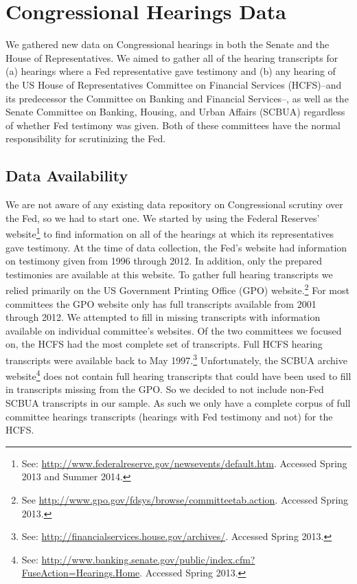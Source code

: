 \documentclass[a4paper]{article}\usepackage[]{graphicx}\usepackage[]{color}
\begin{document}
\section{Congressional Hearings Data}

We gathered new data on Congressional hearings in both the Senate and the House of Representatives. We aimed to gather all of the hearing transcripts for (a) hearings where a Fed representative gave testimony and (b) any hearing of the US House of Representatives Committee on Financial Services (HCFS)--and its predecessor the Committee on Banking and Financial Services--, as well as the Senate Committee on Banking, Housing, and Urban Affairs (SCBUA) regardless of whether Fed testimony was given. Both of these committees have the normal responsibility for scrutinizing the Fed.

\subsection{Data Availability}

We are not aware of any existing data repository on Congressional scrutiny over the Fed, so we had to start one. We started by using the Federal Reserves' website\footnote{See: \url{http://www.federalreserve.gov/newsevents/default.htm}. Accessed Spring 2013 and Summer 2014.} to find information on all of the hearings at which its representatives gave testimony. At the time of data collection, the Fed's website had information on testimony given from 1996 through 2012. In addition, only the prepared testimonies are available at this website. To gather full hearing transcripts we relied primarily on the US Government Printing Office (GPO) website.\footnote{See \url{http://www.gpo.gov/fdsys/browse/committeetab.action}. Accessed Spring 2013.} For most committees the GPO website only has full transcripts available from 2001 through 2012. We attempted to fill in missing transcripts with information available on individual committee's websites. Of the two committees we focused on, the HCFS had the most complete set of transcripts. Full HCFS hearing transcripts were available back to May 1997.\footnote{See: \url{http://financialservices.house.gov/archives/}. Accessed Spring 2013.} Unfortunately, the SCBUA archive website\footnote{See: \url{http://www.banking.senate.gov/public/index.cfm?FuseAction=Hearings.Home}. Accessed Spring 2013.} does not contain full hearing transcripts that could have been used to fill in transcripts missing from the GPO. So we decided to not include non-Fed SCBUA transcripts in our sample. As such we only have a complete corpus of full committee hearings transcripts (hearings with Fed testimony and not) for the HCFS.
\end{document}

